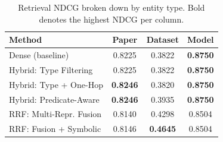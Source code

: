 \begin{table}[ht]
  \centering
  \small
  \caption{Retrieval NDCG broken down by entity type. Bold denotes the highest NDCG per column.}
  \label{tab:retrieval_by_entity_type}
  \begin{tabular}{lccc}
    \toprule
    \textbf{Method} & \textbf{Paper} & \textbf{Dataset} & \textbf{Model} \\
    \midrule
    Dense (baseline) & 0.8225 & 0.3822 & \textbf{0.8750} \\
    Hybrid: Type Filtering & 0.8225 & 0.3822 & \textbf{0.8750} \\
    Hybrid: Type + One-Hop & \textbf{0.8246} & 0.3820 & \textbf{0.8750} \\
    Hybrid: Predicate-Aware & \textbf{0.8246} & 0.3935 & \textbf{0.8750} \\
    RRF: Multi-Repr. Fusion & 0.8140 & 0.4298 & 0.8504 \\
    RRF: Fusion + Symbolic & 0.8146 & \textbf{0.4645} & 0.8504 \\
    \bottomrule
  \end{tabular}
\end{table}
